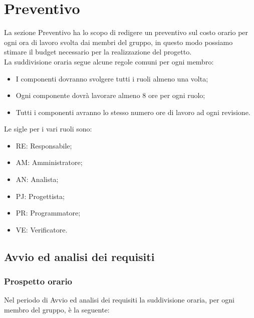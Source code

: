 \section{Preventivo}

La sezione Preventivo ha lo scopo di redigere un preventivo sul costo orario per ogni ora di lavoro svolta dai membri del gruppo, in questo modo possiamo stimare il budget necessario per la realizzazione del progetto. \\
La suddivisione oraria segue alcune regole comuni per ogni membro:
\begin{itemize}
	\item I componenti dovranno svolgere tutti i ruoli almeno una volta;
	\item Ogni componente dovrà lavorare almeno 8 ore per ogni ruolo;
	\item Tutti i componenti avranno lo stesso numero ore di lavoro ad ogni revisione.
\end{itemize}
Le sigle per i vari ruoli sono:
\begin{itemize}
	\item RE: Responsabile;
	\item AM: Amministratore;
	\item AN: Analista;
	\item PJ: Progettista;
	\item PR: Programmatore;
	\item VE: Verificatore.
\end{itemize}

\newpage
\subsection{Avvio ed analisi dei requisiti}
\subsubsection{Prospetto orario}

Nel periodo di Avvio ed analisi dei requisiti la suddivisione oraria, per ogni membro del gruppo, è la seguente:

